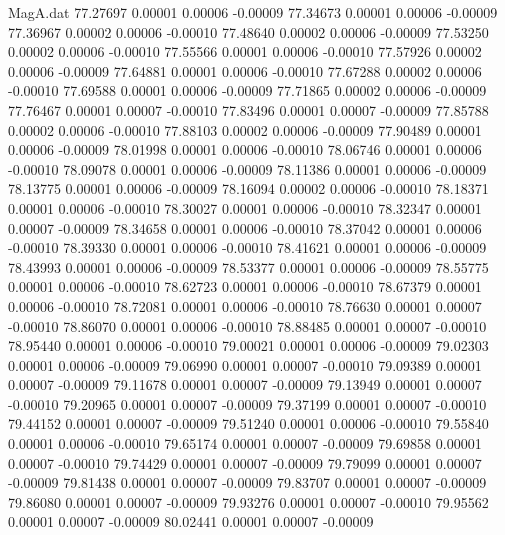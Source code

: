 \begin{filecontents}{MagA.dat}
  77.27697    0.00001    0.00006   -0.00009
  77.34673    0.00001    0.00006   -0.00009
  77.36967    0.00002    0.00006   -0.00010
  77.48640    0.00002    0.00006   -0.00009
  77.53250    0.00002    0.00006   -0.00010
  77.55566    0.00001    0.00006   -0.00010
  77.57926    0.00002    0.00006   -0.00009
  77.64881    0.00001    0.00006   -0.00010
  77.67288    0.00002    0.00006   -0.00010
  77.69588    0.00001    0.00006   -0.00009
  77.71865    0.00002    0.00006   -0.00009
  77.76467    0.00001    0.00007   -0.00010
  77.83496    0.00001    0.00007   -0.00009
  77.85788    0.00002    0.00006   -0.00010
  77.88103    0.00002    0.00006   -0.00009
  77.90489    0.00001    0.00006   -0.00009
  78.01998    0.00001    0.00006   -0.00010
  78.06746    0.00001    0.00006   -0.00010
  78.09078    0.00001    0.00006   -0.00009
  78.11386    0.00001    0.00006   -0.00009
  78.13775    0.00001    0.00006   -0.00009
  78.16094    0.00002    0.00006   -0.00010
  78.18371    0.00001    0.00006   -0.00010
  78.30027    0.00001    0.00006   -0.00010
  78.32347    0.00001    0.00007   -0.00009
  78.34658    0.00001    0.00006   -0.00010
  78.37042    0.00001    0.00006   -0.00010
  78.39330    0.00001    0.00006   -0.00010
  78.41621    0.00001    0.00006   -0.00009
  78.43993    0.00001    0.00006   -0.00009
  78.53377    0.00001    0.00006   -0.00009
  78.55775    0.00001    0.00006   -0.00010
  78.62723    0.00001    0.00006   -0.00010
  78.67379    0.00001    0.00006   -0.00010
  78.72081    0.00001    0.00006   -0.00010
  78.76630    0.00001    0.00007   -0.00010
  78.86070    0.00001    0.00006   -0.00010
  78.88485    0.00001    0.00007   -0.00010
  78.95440    0.00001    0.00006   -0.00010
  79.00021    0.00001    0.00006   -0.00009
  79.02303    0.00001    0.00006   -0.00009
  79.06990    0.00001    0.00007   -0.00010
  79.09389    0.00001    0.00007   -0.00009
  79.11678    0.00001    0.00007   -0.00009
  79.13949    0.00001    0.00007   -0.00010
  79.20965    0.00001    0.00007   -0.00009
  79.37199    0.00001    0.00007   -0.00010
  79.44152    0.00001    0.00007   -0.00009
  79.51240    0.00001    0.00006   -0.00010
  79.55840    0.00001    0.00006   -0.00010
  79.65174    0.00001    0.00007   -0.00009
  79.69858    0.00001    0.00007   -0.00010
  79.74429    0.00001    0.00007   -0.00009
  79.79099    0.00001    0.00007   -0.00009
  79.81438    0.00001    0.00007   -0.00009
  79.83707    0.00001    0.00007   -0.00009
  79.86080    0.00001    0.00007   -0.00009
  79.93276    0.00001    0.00007   -0.00010
  79.95562    0.00001    0.00007   -0.00009
  80.02441    0.00001    0.00007   -0.00009

\end{filecontents}
